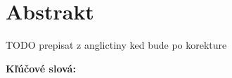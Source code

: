 
\section*{Abstrakt}

TODO prepisat z anglictiny ked bude po korekture 

\begin{flushleft}
  \textbf{Kľúčové slová:}  
\end{flushleft}

